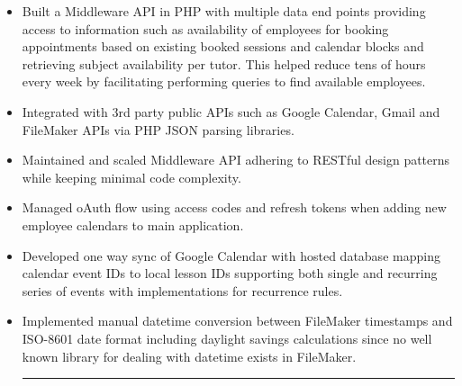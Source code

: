 \documentclass{resume}
\begin{document}
\begin{itemize}
\vspace{4pt}
{\color{dividercolor}\hrule}
\vspace{4pt}

\item \small \raggedright Built a Middleware API in PHP with multiple data end points providing access to information such as availability of employees for booking appointments based on existing booked sessions and calendar blocks and retrieving subject availability per tutor. This helped reduce tens of hours every week by facilitating performing queries to find available employees.
\item \small \raggedright Integrated with 3rd party public APIs such as Google Calendar, Gmail and FileMaker APIs via PHP JSON parsing libraries.
\item \small \raggedright Maintained and scaled Middleware API adhering to RESTful design patterns while keeping minimal code complexity.
\item \small \raggedright Managed oAuth flow using access codes and refresh tokens when adding new employee calendars to main application.
\item \small \raggedright Developed one way sync of Google Calendar with hosted database mapping calendar event IDs to local lesson IDs supporting both single and recurring series of events with implementations for recurrence rules.
\item \small \raggedright Implemented manual datetime conversion between FileMaker timestamps and ISO-8601 date format including daylight savings calculations since no well known library for dealing with datetime exists in FileMaker.

\vspace{4pt}
{\color{dividercolor}\hrule}
\vspace{4pt}


\end{itemize}
\end{document}
